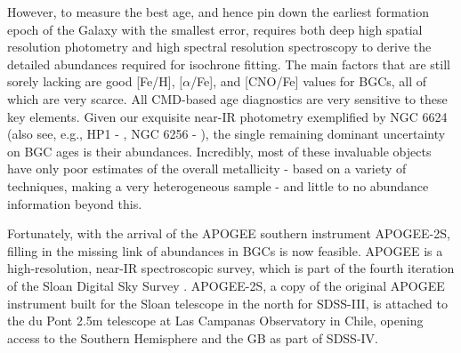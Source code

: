 \documentclass[onecolumn]{aa}
\begin{document}
However, to measure the best age, and hence pin down the earliest formation epoch of the Galaxy with the smallest error, requires both deep high spatial resolution photometry and high spectral resolution spectroscopy to derive the detailed abundances required for isochrone fitting. The main factors that are still sorely lacking are good [Fe/H], $[\alpha$/Fe], and [CNO/Fe] values for BGCs, all of which are very scarce. All CMD-based age diagnostics are very sensitive to these key elements. Given our exquisite near-IR photometry exemplified by NGC 6624 (also see, e.g., HP1 - \citet{Kerber2019}, NGC 6256 - \citet{Cadelano2020}), the single remaining dominant uncertainty on BGC ages is their abundances. Incredibly, most of these invaluable objects have only poor estimates of the overall metallicity - based on a variety of techniques, making a very heterogeneous sample - and little to no abundance information beyond this.


Fortunately, with the arrival of the APOGEE southern instrument APOGEE-2S, filling in the missing link of abundances in BGCs is now feasible. APOGEE is a high-resolution, near-IR spectroscopic survey, which is part of the fourth iteration of the Sloan Digital Sky Survey \citep[SDSS-IV;][]{Blanton2017}. APOGEE-2S, a copy of the original APOGEE instrument built for the Sloan telescope in the north for SDSS-III, is attached to the du Pont 2.5m telescope at Las Campanas Observatory in Chile, opening access to the Southern Hemisphere and the GB as part of SDSS-IV. 
\end{document}
